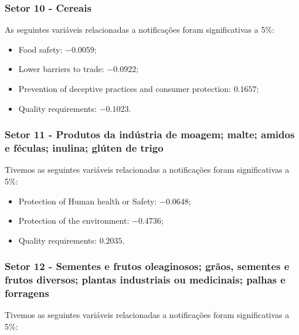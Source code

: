 \newpage

\subsubsection{Setor 10 - Cereais}




As seguintes variáveis relacionadas a notificações foram significativas a 5\%:
\begin{itemize}
    \item Food safety: $-0.0059$;
    \item Lower barriers to trade: $-0.0922$;
    \item Prevention of deceptive practices and consumer protection: $0.1657$;
    \item Quality requirements: $-0.1023$.
\end{itemize}

\newpage

\subsubsection{Setor 11 - Produtos da indústria de moagem; malte; amidos e féculas; inulina; glúten de trigo}




Tivemos as seguintes variáveis relacionadas a notificações foram significativas a 5\%:

\begin{itemize}
    \item Protection of Human health or Safety: $-0.0648$;
    \item Protection of the environment: $-0.4736$;
    \item Quality requirements: $0.2035$.
\end{itemize}

\newpage

\subsubsection{Setor 12 - Sementes e frutos oleaginosos; grãos, sementes e frutos diversos; plantas industriais ou medicinais; palhas e forragens}




Tivemos as seguintes variáveis relacionadas a notificações foram significativas a 5\%:

